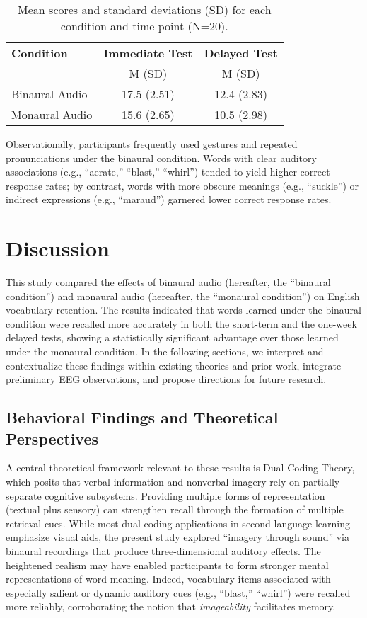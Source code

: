 \documentclass{ehissymp}
\begin{document}
\begin{table}[h!]
\centering
\small
\caption{Mean scores and standard deviations (SD) for each condition and time point (N=20).}
\label{tab:scores}
\begin{tabular}{p{2cm} c c}
\hline
\textbf{Condition} & \textbf{Immediate Test} & \textbf{Delayed Test} \\
& M (SD) & M (SD) \\
\hline
Binaural Audio & 17.5 (2.51) & 12.4 (2.83) \\
Monaural Audio & 15.6 (2.65) & 10.5 (2.98) \\
\hline
\end{tabular}%
\end{table}
Observationally, participants frequently used gestures and repeated pronunciations under the binaural condition. Words with clear auditory associations (e.g., “aerate,” “blast,” “whirl”) tended to yield higher correct response rates; by contrast, words with more obscure meanings (e.g., “suckle”) or indirect expressions (e.g., “maraud”) garnered lower correct response rates.


\section{Discussion}
\label{sec:discussion}
This study compared the effects of binaural audio (hereafter, the “binaural condition”) and monaural audio (hereafter, the “monaural condition”) on English vocabulary retention. The results indicated that words learned under the binaural condition were recalled more accurately in both the short-term and the one-week delayed tests, showing a statistically significant advantage over those learned under the monaural condition. In the following sections, we interpret and contextualize these findings within existing theories and prior work, integrate preliminary EEG observations, and propose directions for future research.


\subsection{Behavioral Findings and Theoretical Perspectives}
A central theoretical framework relevant to these results is Dual Coding Theory\cite{paivio1991}, which posits that verbal information and nonverbal imagery rely on partially separate cognitive subsystems. Providing multiple forms of representation (textual plus sensory) can strengthen recall through the formation of multiple retrieval cues. While most dual-coding applications in second language learning emphasize visual aids\cite{Clark1991,Zhu2017}, the present study explored “imagery through sound” via binaural recordings that produce three-dimensional auditory effects. The heightened realism may have enabled participants to form stronger mental representations of word meaning. Indeed, vocabulary items associated with especially salient or dynamic auditory cues (e.g., “blast,” “whirl”) were recalled more reliably, corroborating the notion that \emph{imageability} facilitates memory\cite{Clark1991}.
\end{document}
